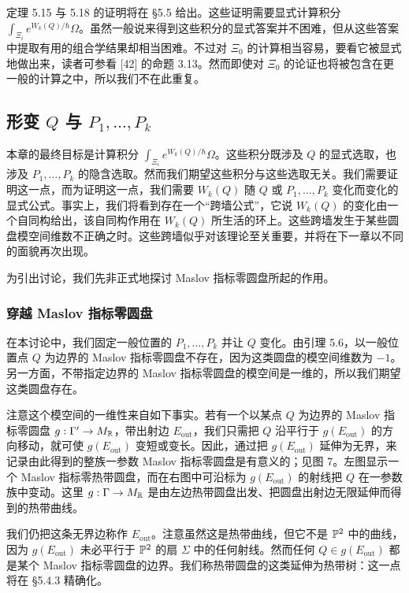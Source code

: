定理 5.15 与 5.18 的证明将在 §5.5 给出。这些证明需要显式计算积分 $\int_{\Xi_i}e^{W_k(Q)/\hbar}\Omega$。虽然一般说来得到这些积分的显式答案并不困难，但从这些答案中提取有用的组合学结果却相当困难。不过对 $\Xi_0$ 的计算相当容易，要看它被显式地做出来，读者可参看 [42] 的命题 3.13。然而即使对 $\Xi_0$ 的论证也将被包含在更一般的计算之中，所以我们不在此重复。

\subsection{形变 $Q$ 与 $P_1,\ldots,P_k$}

本章的最终目标是计算积分 $\int_{\Xi_i}e^{W_k(Q)/\hbar}\Omega$。这些积分既涉及 $Q$ 的显式选取，也涉及 $P_1,\ldots,P_k$ 的隐含选取。然而我们期望这些积分与这些选取无关。我们需要证明这一点，而为证明这一点，我们需要 $W_k(Q)$ 随 $Q$ 或 $P_1,\ldots,P_k$ 变化而变化的显式公式。事实上，我们将看到存在一个“跨墙公式”，它说 $W_k(Q)$ 的变化由一个自同构给出，该自同构作用在 $W_k(Q)$ 所生活的环上。这些跨墙发生于某些圆盘模空间维数不正确之时。这些跨墙似乎对该理论至关重要，并将在下一章以不同的面貌再次出现。

为引出讨论，我们先非正式地探讨 Maslov 指标零圆盘所起的作用。

\subsubsection{穿越 Maslov 指标零圆盘}

在本讨论中，我们固定一般位置的 $P_1,\ldots,P_k$ 并让 $Q$ 变化。由引理 5.6，以一般位置点 $Q$ 为边界的 Maslov 指标零圆盘不存在，因为这类圆盘的模空间维数为 $-1$。另一方面，不带指定边界的 Maslov 指标零圆盘的模空间是一维的，所以我们期望这类圆盘存在。

注意这个模空间的一维性来自如下事实。若有一个以某点 $Q$ 为边界的 Maslov 指标零圆盘 $g:\Gamma'\to M_{\mathbb{R}}$，带出射边 $E_{\mathrm{out}}$，我们只需把 $Q$ 沿平行于 $g(E_{\mathrm{out}})$ 的方向移动，就可使 $g(E_{\mathrm{out}})$ 变短或变长。因此，通过把 $g(E_{\mathrm{out}})$ 延伸为无界，来记录由此得到的整族一参数 Maslov 指标零圆盘是有意义的；见图 7。左图显示一个 Maslov 指标零热带圆盘，而在右图中可沿标为 $g(E_{\mathrm{out}})$ 的射线把 $Q$ 在一参数族中变动。这里 $g:\Gamma\to M_{\mathbb{R}}$ 是由左边热带圆盘出发、把圆盘出射边无限延伸而得到的热带曲线。

我们仍把这条无界边称作 $E_{\mathrm{out}}$。注意虽然这是热带曲线，但它不是 $\mathbb{P}^2$ 中的曲线，因为 $g(E_{\mathrm{out}})$ 未必平行于 $\mathbb{P}^2$ 的扇 $\Sigma$ 中的任何射线。然而任何 $Q\in g(E_{\mathrm{out}})$ 都是某个 Maslov 指标零圆盘的边界。我们称热带圆盘的这类延伸为热带树：这一点将在 §5.4.3 精确化。

